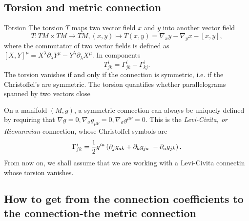 \subsection{Torsion and metric connection}
\begin{mybox}{Torsion}
	The torsion $T$ maps two vector field $x$ and $y$ into another vector field 
	\begin{equation}
		T:TM \times TM \rightarrow TM, (x,y) \mapsto T(x,y) = \nabla_x y - \nabla_y x - [x,y],
	\end{equation}
	where the commutator of two vector fields is defined as $[X,Y]^\mu= X^\lambda \partial_\lambda Y^\mu - Y^\lambda \partial_\lambda X^\mu$.
	In components
	\begin{equation}
		T^i_{jk} = \Gamma^i_{jk} - \Gamma^i_{kj}.
	\end{equation}
	The torsion vanishes if and only if the connection is symmetric, i.e. if the Christoffel's are symmetric. The torsion
	quantifies whether parallelograms spanned by two vectors close
\end{mybox}
On a manifold $(M,g)$, a symmetric connection can always be uniquely defined by requiring that $\nabla g=0, \nabla_{\sigma} g_{\mu \nu} =0, \nabla_{\sigma} g^{\mu \nu}=0$. This is the \emph{Levi-Civita, or Riemannian} connection, whose Christoffel symbols are
\begin{equation}
	\Gamma^i_{jk} = \frac{1}{2} g^{ia} \left(\partial_j g_{ak} + \partial_k g_{j a}\ - \partial_a g_{jk} \right).
\end{equation}
From now on, we shall assume that we are working with a Levi-Civita connectin whose torsion vanishes.



\subsection{How to get from the connection coefficients to the connection-the metric connection}


